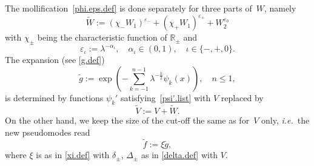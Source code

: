 The mollification~\eqref{phi.eps.def}
is done separately for three parts of~$W$, namely
\begin{equation}\label{W.mol}
\tilde W:=(\chi_-W_1)^{{\varepsilon}_-} + (\chi_+W_1)^{{\varepsilon}_+}+ W_2^{{\varepsilon}_0}
\end{equation}
with $\chi_\pm$ being the characteristic function of ${\mathbb{R}}_\pm$ and
\begin{equation}\label{eps.iota.def}
{\varepsilon}_\iota := \lambda^{-\alpha_\iota}, 
\quad \alpha_\iota \in (0,1), 
\quad \iota \in \{-,+,0\}.
\end{equation}
The expansion (see \eqref{g.def})
\begin{equation}\label{moly}
\tilde g
  := \exp\left(- \sum_{k=-1}^{n-1}\lambda^{-\frac k2} \psi_k(x)\right), 
\quad  n \leq 1,
\end{equation}
is determined by functions $\psi_{k}'$ satisfying~\eqref{psi'.list}
with $V$ replaced by 
\begin{equation}\label{V.mol}
\tilde V := V + \tilde W. 
\end{equation}
On the other hand, we keep the size of the cut-off the same as for~$V$ only, 
{\emph{i.e.}}~the new pseudomodes read
\begin{equation}\label{f.mol}
\tilde f := \xi \tilde g, 
\end{equation}
where $\xi$ is as in \eqref{xi.def} with $\delta_\pm$, $\Delta_\pm$ as in \eqref{delta.def} with $V$.

